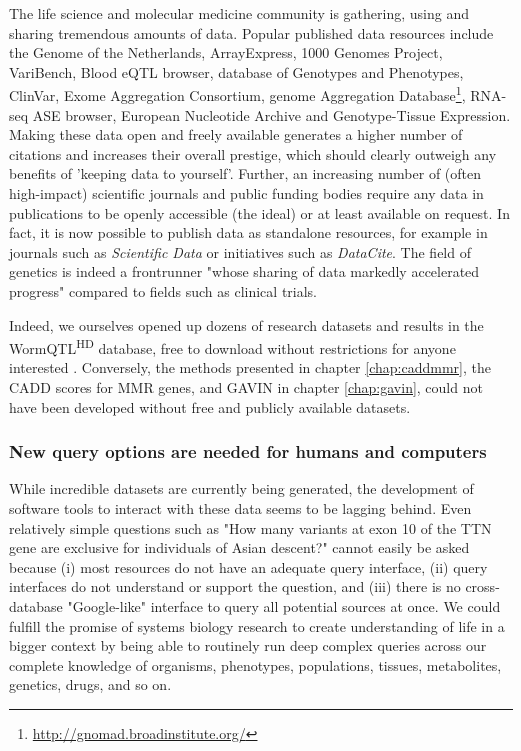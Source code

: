 The life science and molecular medicine community is gathering, using and sharing tremendous amounts of data. 
Popular published data resources include the Genome of the Netherlands\cite{Francioli_2014}, Ar\-ray\-Ex\-press\cite{Rustici_2012}, 1000 Ge\-no\-mes Pro\-ject\cite{Auton_2015}, Va\-ri\-Bench\cite{Nair_2012}, Blood eQTL brow\-ser\cite{Westra_2013}, database of Geno\-types and Pheno\-types\cite{Mailman_2007}, Clin\-Var\cite{Landrum_2013}, Exome Aggregation Consortium\cite{Lek_2016}, genome Aggregation Database\footnote{\url{http://gnomad.broadinstitute.org/}}, RNA-seq ASE brow\-ser\cite{Deelen_2015}, Eu\-ro\-pe\-an Nu\-cleo\-tide Ar\-chive\cite{Leinonen_2010} and Ge\-no\-type-Tis\-sue Ex\-pres\-sion\cite{Lonsdale_2013}.
Making these data open and freely available generates a higher number of citations and increases their overall prestige, which should clearly outweigh any benefits of 'keeping data to yourself'.
Further, an increasing number of (often high-impact) scientific journals and public funding bodies require any data in publications to be openly accessible (the ideal) or at least available on request.
In fact, it is now possible to publish data as standalone resources, for example in journals such as \textsl{Scientific Data} or initiatives such as \textsl{DataCite}.
The field of genetics is indeed a frontrunner "whose sharing of data markedly accelerated progress"\cite{Rosenbaum_2017} compared to fields such as clinical trials.

Indeed, we ourselves opened up dozens of research datasets and results in the WormQTL\textsuperscript{HD} database, free to download without restrictions for anyone interested .
Conversely, the methods presented in chapter \ref{chap:caddmmr}, the CADD scores for MMR genes, and GAVIN in chapter \ref{chap:gavin}, could not have been developed without free and publicly available datasets.

\subsubsection*{New query options are needed for humans and computers}

While incredible datasets are currently being generated, the development of software tools to interact with these data seems to be lagging behind.
Even relatively simple questions such as "How many variants at exon 10 of the TTN gene are exclusive for individuals of Asian descent?" cannot easily be asked because
(i) most resources do not have an adequate query interface,
(ii) query interfaces do not understand or support the question, and
(iii) there is no cross-database "Google-like" interface to query all potential sources at once.
We could fulfill the promise of systems biology research to create understanding of life in a bigger context by being able to routinely run deep complex queries across our complete knowledge of organisms, phenotypes, populations, tissues, metabolites, genetics, drugs, and so on.

